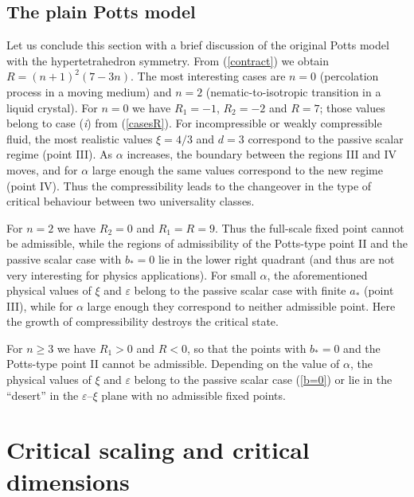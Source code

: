 \documentclass[12pt]{iopart}
\begin{document}
\subsection{The plain Potts model} \label{ppm}


Let us conclude this section with a brief discussion of the original Potts
model with the hypertetrahedron symmetry. From (\ref{contract}) we obtain
$R=(n+1)^{2}(7-3n)$. The most interesting cases are $n=0$ (percolation
process in a moving medium) and $n=2$ (nematic-to-isotropic transition
in a liquid crystal). For $n=0$ we have $R_{1}=-1$, $R_{2}=-2$ and $R=7$;
those values belong to case ({\it i}) from (\ref{casesR}). For incompressible
or weakly compressible fluid, the most realistic values $\xi=4/3$ and $d=3$
correspond to the passive scalar regime (point III). As $\alpha$ increases,
the boundary between the regions III and IV moves, and for $\alpha$ large
enough the same values correspond to the new regime (point IV). Thus the
compressibility leads to the changeover in the type of critical behaviour
between two universality classes.

For $n=2$ we have $R_{2}=0$ and $R_{1}=R=9$. Thus the full-scale fixed point
cannot be admissible, while the regions of admissibility of the Potts-type
point II and the passive scalar case with $b_{*}=0$ lie in the lower right
quadrant (and thus are not very interesting for physics applications). For
small $\alpha$, the aforementioned physical values of $\xi$ and $\varepsilon$
belong to the passive scalar case with finite $a_{*}$ (point III), while for
$\alpha$ large enough they correspond to neither admissible point. Here the
growth of compressibility destroys the critical state.

For $n\ge3$ we have $R_{1}>0$ and $R<0$, so that the points with $b_{*}=0$
and the Potts-type point II cannot be admissible. Depending on the value of
$\alpha$, the physical values of $\xi$ and $\varepsilon$ belong to the
passive scalar case (\ref{b=0}) or lie in the ``desert'' in the
$\varepsilon$--$\xi$ plane with no admissible fixed points.



\section{Critical scaling and critical dimensions} \label{sec:DimeNS}
\end{document}
